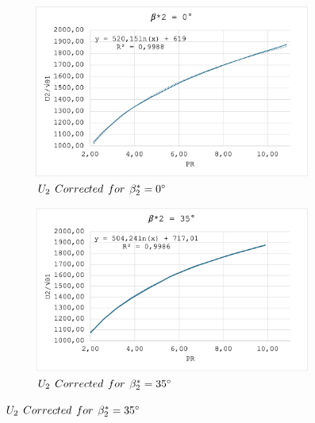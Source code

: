 \documentclass[12pt, letter]{report}
\begin{document}
\begin{figure}[H]
  \centering
  \begin{subfigure}{0.49\linewidth}
    \includegraphics[width=\linewidth]{figures/B2=0.png}
    \caption{$U_2 \hspace{0.15cm} Corrected \hspace{0.15cm} for \hspace{0.15cm} \beta_2^*=0\degree$ \cite{lectureslides}}
    \label{fig:U2 Correcte B=0}
  \end{subfigure}
  \hfill
  \begin{subfigure}{0.49\linewidth}
    \includegraphics[width=\linewidth]{figures/B2_35.png}
    \caption{$U_2 \hspace{0.15cm} Corrected \hspace{0.15cm} for \hspace{0.15cm} \beta_2^*=35\degree$ \cite{lectureslides}}
    \label{fig:U2 Correcte B=35}
  \end{subfigure}
  

\end{figure}
\end{document}
